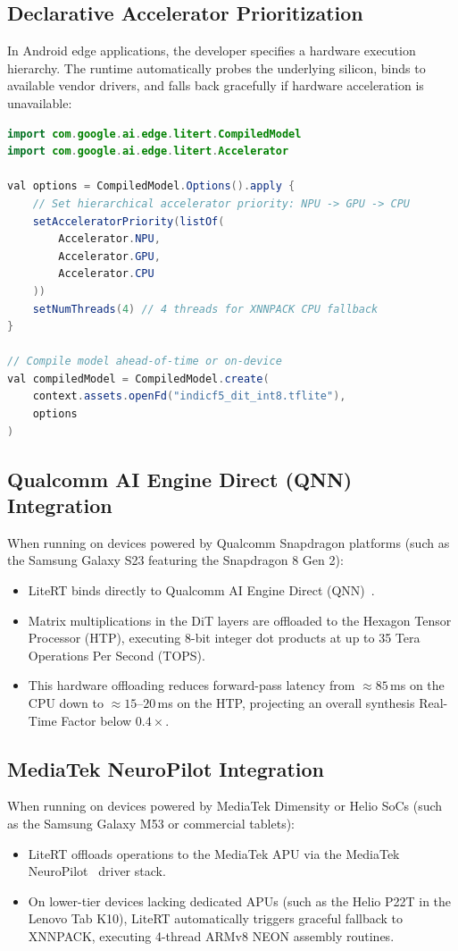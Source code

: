 \subsection{Declarative Accelerator Prioritization}
In Android edge applications, the developer specifies a hardware execution hierarchy. The runtime automatically probes the underlying silicon, binds to available vendor drivers, and falls back gracefully if hardware acceleration is unavailable:

\begin{lstlisting}[language=Java,caption={Kotlin/Android CompiledModel Initialization with Accelerator Priority}]
import com.google.ai.edge.litert.CompiledModel
import com.google.ai.edge.litert.Accelerator

val options = CompiledModel.Options().apply {
    // Set hierarchical accelerator priority: NPU -> GPU -> CPU
    setAcceleratorPriority(listOf(
        Accelerator.NPU,
        Accelerator.GPU,
        Accelerator.CPU
    ))
    setNumThreads(4) // 4 threads for XNNPACK CPU fallback
}

// Compile model ahead-of-time or on-device
val compiledModel = CompiledModel.create(
    context.assets.openFd("indicf5_dit_int8.tflite"),
    options
)
\end{lstlisting}

\subsection{Qualcomm AI Engine Direct (QNN) Integration}
When running on devices powered by Qualcomm Snapdragon platforms (such as the Samsung Galaxy S23 featuring the Snapdragon 8 Gen 2):
\begin{itemize}
    \item LiteRT binds directly to Qualcomm AI Engine Direct (QNN)~\cite{qualcomm_qnn2024}.
    \item Matrix multiplications in the DiT layers are offloaded to the Hexagon Tensor Processor (HTP), executing 8-bit integer dot products at up to 35 Tera Operations Per Second (TOPS).
    \item This hardware offloading reduces forward-pass latency from $\approx 85$\,ms on the CPU down to $\approx 15\text{--}20$\,ms on the HTP, projecting an overall synthesis Real-Time Factor below $0.4\times$.
\end{itemize}

\subsection{MediaTek NeuroPilot Integration}
When running on devices powered by MediaTek Dimensity or Helio SoCs (such as the Samsung Galaxy M53 or commercial tablets):
\begin{itemize}
    \item LiteRT offloads operations to the MediaTek APU via the MediaTek NeuroPilot~\cite{mediatek_neuropilot2024} driver stack.
    \item On lower-tier devices lacking dedicated APUs (such as the Helio P22T in the Lenovo Tab K10), LiteRT automatically triggers graceful fallback to XNNPACK, executing 4-thread ARMv8 NEON assembly routines.
\end{itemize}

